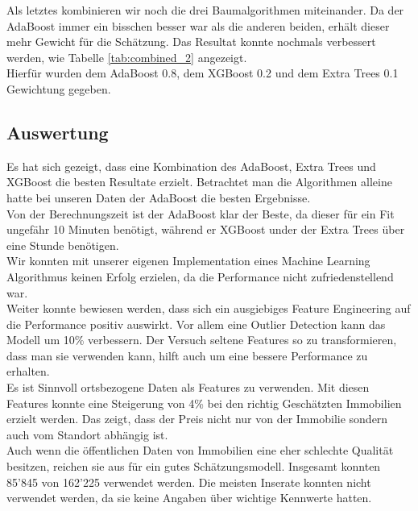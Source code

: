 %
Als letztes kombinieren wir noch die drei Baumalgorithmen miteinander. Da der AdaBoost immer ein bisschen besser war als die anderen beiden, erhält dieser mehr Gewicht für die Schätzung. Das Resultat konnte nochmals verbessert werden, wie Tabelle \ref{tab:combined_2} angezeigt.\\
Hierfür wurden dem AdaBoost 0.8, dem XGBoost 0.2 und dem Extra Trees 0.1  Gewichtung gegeben.
%
\begin{table}[ht]
\centering
{}
\caption{Ergebnisse ohne ortsbezogenen Daten vom BFS}
\label{tab:combined_2}
\end{table}

%
\subsection{Auswertung}
Es hat sich gezeigt, dass eine Kombination des AdaBoost, Extra Trees und XGBoost die besten Resultate erzielt. Betrachtet man die Algorithmen alleine hatte bei unseren Daten der AdaBoost die besten Ergebnisse.\\ 
Von der Berechnungszeit ist der AdaBoost klar der Beste, da dieser für ein Fit ungefähr 10 Minuten benötigt, während er XGBoost under der Extra Trees über eine Stunde benötigen.\\
Wir konnten mit unserer eigenen Implementation eines Machine Learning Algorithmus keinen Erfolg erzielen, da die Performance nicht zufriedenstellend war.\\[2ex]
%
Weiter konnte bewiesen werden, dass sich ein ausgiebiges Feature Engineering auf die Performance positiv auswirkt. Vor allem eine Outlier Detection kann das Modell um 10\% verbessern. Der Versuch seltene Features so zu transformieren, dass man sie verwenden kann, hilft auch um eine bessere Performance zu erhalten. \\
Es ist Sinnvoll ortsbezogene Daten als Features zu verwenden. Mit diesen Features konnte eine Steigerung von 4\% bei den richtig Geschätzten Immobilien erzielt werden. Das zeigt, dass der Preis nicht nur von der Immobilie sondern auch vom Standort abhängig ist. \\[2ex]
%
Auch wenn die öffentlichen Daten von Immobilien eine eher schlechte Qualität besitzen, reichen sie aus für ein gutes Schätzungsmodell. Insgesamt konnten 85’845 von 162’225 verwendet werden. Die meisten Inserate konnten nicht verwendet werden, da sie keine Angaben über wichtige Kennwerte hatten.

